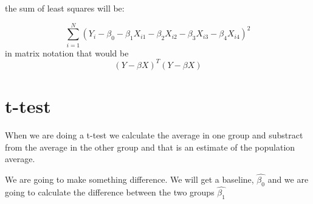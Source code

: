 \documentclass[
  letterpaper,
  DIV=11,
  numbers=noendperiod]{scrartcl}
\begin{document}
the sum of least squares will be:

\[ 
\sum_{i=1}^{N} \left(Y_i - \beta_0 - \beta_1 X_{i1} - \beta_2 X_{i2} - \beta_3 X_{i3} - \beta_4 X_{i4}\right)^2
\] in matrix notation that would be \[
(Y-\beta X)^T(Y-\beta X) 
\]

\section{t-test}\label{t-test}

When we are doing a t-test we calculate the average in one group and
substract from the average in the other group and that is an estimate of
the population average.

We are going to make something difference. We will get a baseline,
\(\hat{\beta_0}\) and we are going to calculate the difference between
the two groups \(\hat{\beta_1}\)
\end{document}
